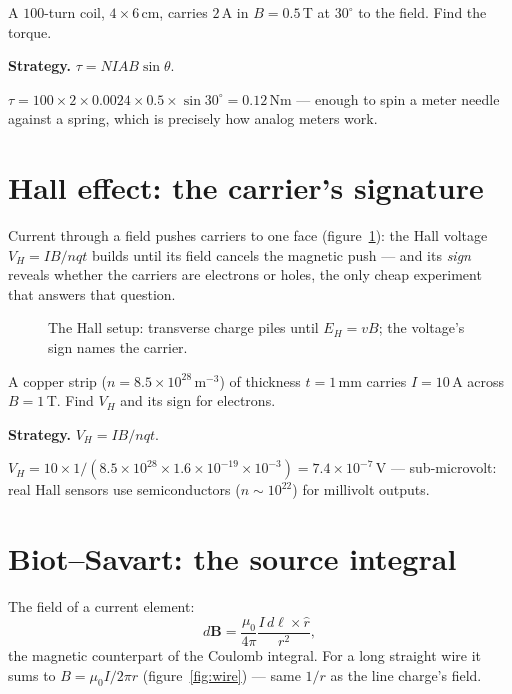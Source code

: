 \begin{example}\label{ex:torque}
A $100$-turn coil, $4\times6$\,cm, carries $2$\,A in $B=0.5$\,T at
$30^{\circ}$ to the field. Find the torque.
\par\smallskip
\textbf{Strategy.} $\tau=NIAB\sin\theta$.
\begin{solution}
$\tau=100\times2\times0.0024\times0.5\times\sin30^{\circ}=0.12$\,Nm ---
enough to spin a meter needle against a spring, which is precisely how
analog meters work. \checkmark
\end{solution}
\end{example}

\section{Hall effect: the carrier's signature}\label{sec:mag-hall}

Current through a field pushes carriers to one face
(figure~\ref{fig:hall}): the Hall voltage $V_H=IB/nqt$ builds until its
field cancels the magnetic push --- and its \emph{sign} reveals whether
the carriers are electrons or holes, the only cheap experiment that
answers that question.

\begin{figure}[htbp]\centering

\caption{The Hall setup: transverse charge piles until $E_H=vB$; the
voltage's sign names the carrier.}
\label{fig:hall}
\end{figure}

\begin{example}\label{ex:hallv}
A copper strip ($n=8.5\times10^{28}$\,m$^{-3}$) of thickness
$t=1$\,mm carries $I=10$\,A across $B=1$\,T. Find $V_H$ and its sign
for electrons.
\par\smallskip
\textbf{Strategy.} $V_H=IB/nqt$.
\begin{solution}
$V_H=10\times1/(8.5\times10^{28}\times1.6\times10^{-19}\times10^{-3})
=7.4\times10^{-7}$\,V --- sub-microvolt: real Hall sensors use
semiconductors ($n\sim10^{22}$) for millivolt outputs. \checkmark
\end{solution}
\end{example}

\section{Biot--Savart: the source integral}\label{sec:mag-bs}

The field of a current element:
\begin{equation}
  d\mathbf B=\frac{\mu_0}{4\pi}\frac{I\,d\boldsymbol\ell\times\hat r}{r^{2}},
  \label{eq:bs}
\end{equation}
the magnetic counterpart of the Coulomb integral. For a long straight
wire it sums to $B=\mu_0I/2\pi r$ (figure~\ref{fig:wire}) --- same
$1/r$ as the line charge's field.

